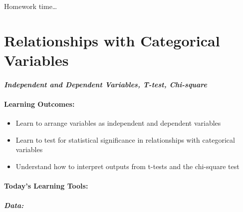 \documentclass[
]{book}
\providecommand{\tightlist}{%
  \setlength{\itemsep}{0pt}\setlength{\parskip}{0pt}}
\begin{document}
Homework time\ldots{}

\hypertarget{relationships-with-categorical-variables}{%
\chapter{Relationships with Categorical Variables}\label{relationships-with-categorical-variables}}

\hypertarget{independent-and-dependent-variables-t-test-chi-square}{%
\subsubsection*{\texorpdfstring{\emph{Independent and Dependent Variables, T-test, Chi-square}}{Independent and Dependent Variables, T-test, Chi-square}}\label{independent-and-dependent-variables-t-test-chi-square}}

\hypertarget{learning-outcomes-6}{%
\subsubsection*{Learning Outcomes:}\label{learning-outcomes-6}}

\begin{itemize}
\tightlist
\item
  Learn to arrange variables as independent and dependent variables
\item
  Learn to test for statistical significance in relationships with categorical variables
\item
  Understand how to interpret outputs from t-tests and the chi-square test
\end{itemize}

\hypertarget{todays-learning-tools-6}{%
\subsubsection*{Today's Learning Tools:}\label{todays-learning-tools-6}}

\hypertarget{data-6}{%
\paragraph*{\texorpdfstring{\emph{Data:}}{Data:}}\label{data-6}}
\end{document}
